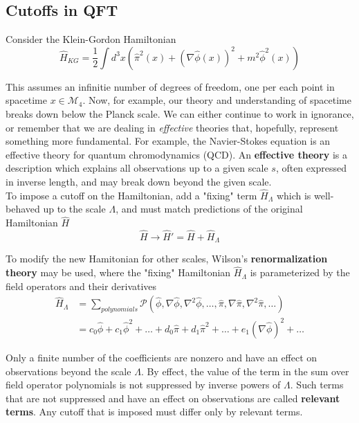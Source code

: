 \subsection*{Cutoffs in QFT}

\noindent Consider the Klein-Gordon Hamiltonian
\begin{equation}
\hat{H}_{KG} = \frac{1}{2} \int d^3 x \left( \hat{\pi}^2(x) + (\nabla \hat{\phi} (x))^2 + m^2 \hat{\phi}^2(x) \right)
\end{equation}

\noindent This assumes an infinitie number of degrees of freedom, one per each point in spacetime $x \in \mathcal{M}_4$. Now, for example, our theory and understanding of spacetime breaks down below the Planck scale. We can either continue to work in ignorance, or remember that we are dealing in \textit{effective} theories that, hopefully, represent something more fundamental. For example, the Navier-Stokes equation is an effective theory for quantum chromodynamics (QCD). An \textbf{effective theory} is a description which explains all observations up to a given scale $s$, often expressed in inverse length, and may break down beyond the given scale. \\

\noindent To impose a cutoff on the Hamiltonian, add a "fixing" term $\hat{H}_\Lambda$ which is well-behaved up to the scale $\Lambda$, and must match predictions of the original Hamiltonian $\hat{H}$
\begin{equation}
\hat{H} \to \hat{H}' = \hat{H} + \hat{H}_\Lambda
\end{equation}

\noindent To modify the new Hamitonian for other scales, Wilson's \textbf{renormalization theory} may be used, where the "fixing" Hamiltonian $\hat{H}_\Lambda$ is parameterized by the field operators and their derivatives
\begin{align}
\hat{H}_\Lambda &= \sum_{polynomials} \mathcal{P}(\hat{\phi}, \nabla \hat{\phi}, \nabla^2 \hat{\phi}, \dots, \hat{\pi}, \nabla \hat{\pi}, \nabla^2 \hat{\pi}, \dots) \\
&= c_0 \hat{\phi} + c_1 \hat{\phi}^2 + \dots + d_0 \hat{\pi} + d_1 \hat{\pi}^2 + \dots + e_1 (\nabla \hat{\phi})^2 + \dots
\end{align}

\noindent Only a finite number of the coefficients are nonzero and have an effect on observations beyond the scale $\Lambda$. By effect, the value of the term in the sum over field operator polynomials is not suppressed by inverse powers of $\Lambda$. Such terms that are not suppressed and have an effect on observations are called \textbf{relevant terms}. Any cutoff that is imposed must differ only by relevant terms. \\

